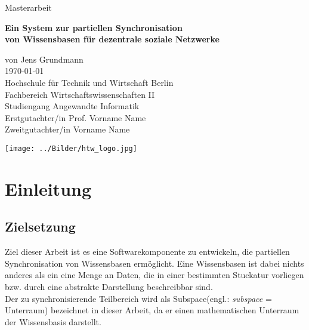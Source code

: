\documentclass[a4paper]{article}
\begin{document}
	\begin{titlepage}
		\begin{flushright}	
			{\large Masterarbeit \\}
			\begin{Large}
				\textbf{
					Ein System zur partiellen Synchronisation \\ 
					von Wissensbasen für dezentrale soziale Netzwerke \\
				} 
			\end{Large}
			\vspace{1.0cm}
			\begin{large}	
				von Jens Grundmann \\
				\today \\
				\vspace{1.0cm}
				Hochschule für Technik und Wirtschaft Berlin \\
				Fachbereich Wirtschaftswissenschaften II \\
				Studiengang Angewandte Informatik \\
				\vspace{1.0cm}
				Erstgutachter/in Prof. Vorname Name \\
				Zweitgutachter/in Vorname Name \\	
				\vspace{0.5cm}
				\begin{center}
					\texttt{[image: ../Bilder/htw\_logo.jpg]}
				\end{center}				
			\end{large}
		\end{flushright}	
	\end{titlepage}
	
	\ClearWallPaper
	\tableofcontents
	\newpage

	\section{Einleitung}

	\subsection{Zielsetzung}
	
	Ziel dieser Arbeit ist es eine Softwarekomponente zu entwickeln, die 
	partiellen Synchronisation von Wissensbasen ermöglicht. Eine Wissensbasen
	ist dabei nichts anderes als ein eine Menge an Daten, die in einer
	bestimmten Stuckatur vorliegen bzw. durch eine abstrakte Darstellung
	beschreibbar sind. \\
	Der zu synchronisierende Teilbereich wird als Subspace(engl.:
	\emph{subspace} = Unterraum) bezeichnet in dieser Arbeit, da er einen
	mathematischen Unterraum der Wissensbasis darstellt.
	
\end{document}
